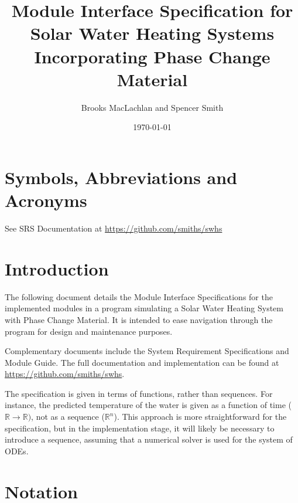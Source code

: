 \documentclass[12pt, titlepage]{article}
\begin{document}
\title{Module Interface Specification for Solar Water Heating Systems
  Incorporating Phase Change Material}

\author{Brooks MacLachlan and Spencer Smith}

\date{\today}

\maketitle


\newpage

\tableofcontents

\newpage

\section{Symbols, Abbreviations and Acronyms}

See SRS Documentation at \url{https://github.com/smiths/swhs}


\section{Introduction}

The following document details the Module Interface Specifications for the
implemented modules in a program simulating a Solar Water Heating System with
Phase Change Material.  It is intended to ease navigation through the program
for design and maintenance purposes.

Complementary documents include the System Requirement Specifications
and Module Guide.  The full documentation and implementation can be
found at \url{https://github.com/smiths/swhs}.

The specification is given in terms of functions, rather than sequences.  For
instance, the predicted temperature of the water is given as a function of time
($\mathbb{R} \rightarrow \mathbb{R})$, not as a sequence ($\mathbb{R}^n$).  This
approach is more straightforward for the specification, but in the
implementation stage, it will likely be necessary to introduce a
sequence, assuming that a numerical solver is used for the system of ODEs.

\section{Notation}
\end{document}
